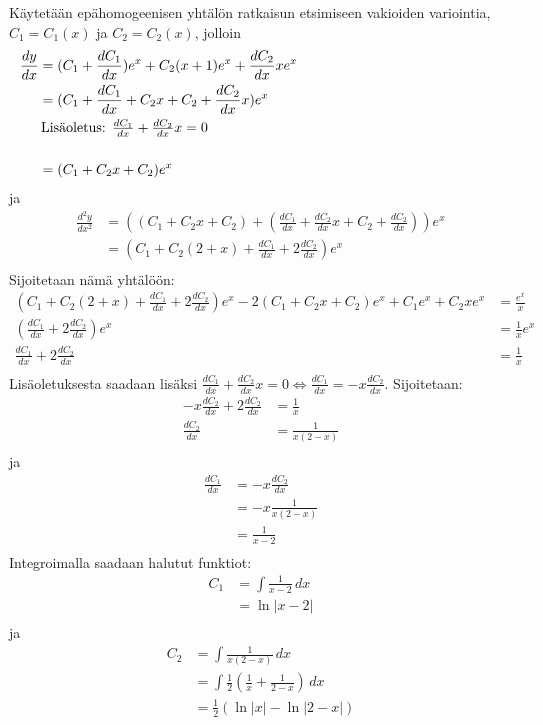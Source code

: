 \documentclass{article}
\begin{document}
Käytetään epähomogeenisen yhtälön ratkaisun etsimiseen vakioiden variointia,
$C_1 = C_1(x)$ ja $C_2 = C_2(x)$, jolloin
\begin{align*}
  \frac{dy}{dx} &= (C_1 + \frac{dC_1}{dx})e^x + C_2(x + 1)e^x + \frac{dC_2}{dx}xe^x \\
                &= (C_1 + \frac{dC_1}{dx} + C_2x + C_2 + \frac{dC_2}{dx}x)e^x \\
  \noalign{\text{Lisäoletus: $\frac{dC_1}{dx} + \frac{dC_2}{dx}x = 0$}} \\
                &= (C_1 + C_2x + C_2)e^x \\
\end{align*}
ja
\begin{align*}
  \frac{d^2 y}{d x^2} &= ((C_1 + C_2x + C_2) + (\frac{dC_1}{dx} + \frac{dC_2}{dx}x + C_2 + \frac{dC_2}{dx}))e^x \\
                      &= (C_1 + C_2(2 + x) + \frac{dC_1}{dx} + 2\frac{dC_2}{dx})e^x \\
\end{align*}
Sijoitetaan nämä yhtälöön:
\begin{align*}
  (C_1 + C_2(2 + x) + \frac{dC_1}{dx} + 2\frac{dC_2}{dx})e^x
  - 2(C_1 + C_2x + C_2)e^x
  + C_1e^x + C_2xe^x &= \frac{e^x}{x} \\
  (\frac{dC_1}{dx} + 2\frac{dC_2}{dx})e^x &= \frac{1}{x}e^x \\
  \frac{dC_1}{dx} + 2\frac{dC_2}{dx} &= \frac{1}{x} \\
\end{align*}
Lisäoletuksesta saadaan lisäksi $\frac{dC_1}{dx} + \frac{dC_2}{dx}x = 0 \iff \frac{dC_1}{dx} = -x\frac{dC_2}{dx}$.
Sijoitetaan:
\begin{align*}
  -x\frac{dC_2}{dx} + 2\frac{dC_2}{dx} &= \frac{1}{x} \\
  \frac{dC_2}{dx} &= \frac{1}{x(2 - x)} \\
\end{align*}
ja
\begin{align*}
  \frac{dC_1}{dx} &= -x\frac{dC_2}{dx} \\
                  &= -x\frac{1}{x(2 - x)} \\
                  &= \frac{1}{x - 2} \\
\end{align*}
Integroimalla saadaan halutut funktiot:
\begin{align*}
  C_1 &= \int \frac{1}{x - 2}\,dx \\
      &= \ln |x - 2| \\
\end{align*}
ja
\begin{align*}
  C_2 &= \int \frac{1}{x(2 - x)}\,dx \\
      &= \int \frac{1}{2}(\frac{1}{x} + \frac{1}{2-x})\,dx \\
      &= \frac{1}{2}(\ln |x| - \ln |2-x|) \\
\end{align*}
\end{document}
